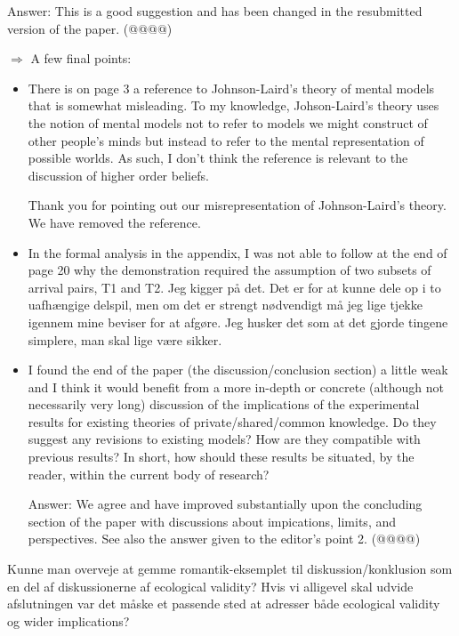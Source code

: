 \documentclass[a4paper]{article}
\newenvironment{response}{\smallskip \noindent \color{blue}}{\color{black}\smallskip}
\newenvironment{robin}{\smallskip \noindent \color{red!10!green!50!blue}}{\color{black}\smallskip}
\newenvironment{tobo}{\smallskip \noindent \color{yellow!80!black!80}}{\color{black}\smallskip}
\begin{document}
\begin{itemize}
\begin{robin}Answer: This is a good suggestion and has been changed in the resubmitted version of the paper. (@@@@) \end{robin}
\end{itemize}

$\Rightarrow$ A few final points:
\begin{itemize}
\item  There is on page 3 a reference to Johnson-Laird's theory of mental models that is somewhat misleading. To my knowledge, Johson-Laird's theory uses the notion of mental models not to refer to models we might construct of other people's minds but instead to refer to the mental representation of possible worlds. As such, I don't think the reference is relevant to the discussion of higher order beliefs.

\begin{response} Thank you for pointing out our misrepresentation of Johnson-Laird's theory. We have removed the reference.\end{response}
 
\item In the formal analysis in the appendix, I was not able to follow at the end of page 20 why the demonstration required the assumption of two subsets of arrival pairs, T1 and T2.
\begin{tobo}
Jeg kigger på det. Det er for at kunne dele op i to uafhængige delspil, men om det er strengt nødvendigt må jeg lige tjekke igennem mine beviser for at afgøre. Jeg husker det som at det gjorde tingene simplere, man skal lige være sikker. 
\end{tobo}



\item I found the end of the paper (the discussion/conclusion section) a little weak and I think it would benefit from a more in-depth or concrete (although not necessarily very long) discussion of the implications of the experimental results for existing theories of private/shared/common knowledge. Do they suggest any revisions to existing models? How are they compatible with previous results? In short, how should these results be situated, by the reader, within the current body of research?

\begin{response} Answer: We agree and have improved substantially upon the concluding section of the paper with discussions about impications, limits, and perspectives. See also the answer given to the editor's point 2. (@@@@) \end{response}
\end{itemize}
\begin{tobo}
Kunne man overveje at gemme romantik-eksemplet til diskussion/konklusion som en del af diskussionerne af ecological validity? Hvis vi alligevel skal udvide afslutningen var det måske et passende sted at adresser både ecological validity og wider implications? 
\end{tobo}
\end{document}

